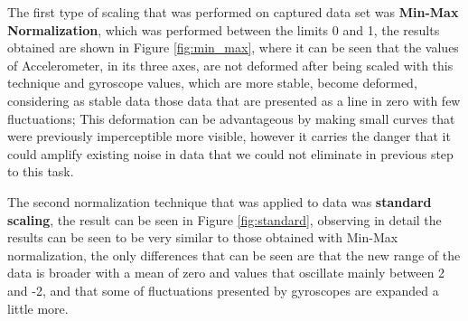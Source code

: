 \vspace{5mm} %

The first type of scaling that was performed on captured data set was \textbf{Min-Max Normalization}, which was performed between the limits 0 and 1, the results obtained are shown in Figure \ref{fig:min_max}, where it can be seen that the values of Accelerometer, in its three axes, are not deformed after being scaled with this technique and gyroscope values, which are more stable, become deformed, considering as stable data those data that are presented as a line in zero with few fluctuations; This deformation can be advantageous by making small curves that were previously imperceptible more visible, however it carries the danger that it could amplify existing noise in data that we could not eliminate in previous step to this task.

\vspace{5mm} %

The second normalization technique that was applied to data was \textbf{standard scaling}, the result can be seen in Figure \ref{fig:standard}, observing in detail the results can be seen to be very similar to those obtained with Min-Max normalization, the only differences that can be seen are that the new range of the data is broader with a mean of zero and values that oscillate mainly between 2 and -2, and that some of fluctuations presented by gyroscopes are expanded a little more.

